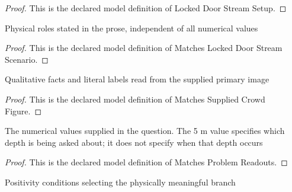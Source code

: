 \begin{proof}
  This is the declared model definition of Locked Door Stream Setup.
\end{proof}
\begin{definition}
  \label{def:physics:phyx-mini-0728:phyxminiproblems-problemphyxmini0728-matcheslockeddoorstreamscenario}
  Physical roles stated in the prose, independent of all numerical values
\end{definition}
\begin{proof}
  This is the declared model definition of Matches Locked Door Stream Scenario.
\end{proof}
\begin{definition}
  \label{def:physics:phyx-mini-0728:phyxminiproblems-problemphyxmini0728-matchessuppliedcrowdfigure}
  Qualitative facts and literal labels read from the supplied primary image
\end{definition}
\begin{proof}
  This is the declared model definition of Matches Supplied Crowd Figure.
\end{proof}
\begin{definition}
  \label{def:physics:phyx-mini-0728:phyxminiproblems-problemphyxmini0728-matchesproblemreadouts}
  The numerical values supplied in the question. The 5 m value specifies which depth is being asked about; it does not specify when that depth occurs
\end{definition}
\begin{proof}
  This is the declared model definition of Matches Problem Readouts.
\end{proof}
\begin{definition}
  \label{def:physics:phyx-mini-0728:phyxminiproblems-problemphyxmini0728-hasphysicalstreamparameters}
  Positivity conditions selecting the physically meaningful branch
\end{definition}
